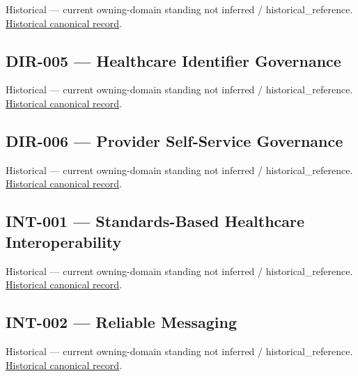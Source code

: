 \par\label{element:f866ae5adb08499794331bc600db827c}
Historical — current owning-domain standing not inferred / historical\_reference. \href{../../../../continuum/motivation/requirement/f866ae5adb08499794331bc600db827c.md}{Historical canonical record}.\par

\subsection{DIR-005 — Healthcare Identifier Governance}

\par\label{element:097368b4b0b4468dbf1c57c11d9ed86c}
Historical — current owning-domain standing not inferred / historical\_reference. \href{../../../../continuum/motivation/requirement/097368b4b0b4468dbf1c57c11d9ed86c.md}{Historical canonical record}.\par

\subsection{DIR-006 — Provider Self-Service Governance}

\par\label{element:4230f93461a4470383fb99fddc35f8bf}
Historical — current owning-domain standing not inferred / historical\_reference. \href{../../../../continuum/motivation/requirement/4230f93461a4470383fb99fddc35f8bf.md}{Historical canonical record}.\par

\subsection{INT-001 — Standards-Based Healthcare Interoperability}

\par\label{element:44dba056ada04f6583b77859aac9ac68}
Historical — current owning-domain standing not inferred / historical\_reference. \href{../../../../continuum/motivation/requirement/44dba056ada04f6583b77859aac9ac68.md}{Historical canonical record}.\par

\subsection{INT-002 — Reliable Messaging}

\par\label{element:aac9b66911e849cb9792c3a2b7eacb88}
Historical — current owning-domain standing not inferred / historical\_reference. \href{../../../../continuum/motivation/requirement/aac9b66911e849cb9792c3a2b7eacb88.md}{Historical canonical record}.\par

